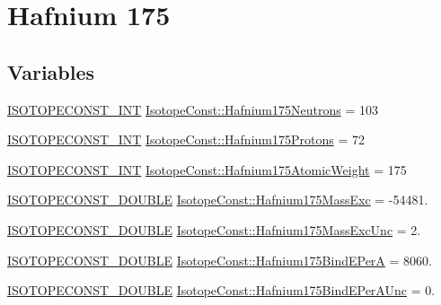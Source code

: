 \hypertarget{group___isotope_const-_hafnium-_hf175}{}\section{Hafnium 175}
\label{group___isotope_const-_hafnium-_hf175}
\subsection*{Variables}
\begin{DoxyCompactItemize}
\item 
\mbox{\hyperlink{group___isotope_const-_macros_ga5f18360b3e99483a35c32d789e62621c}{I\+S\+O\+T\+O\+P\+E\+C\+O\+N\+S\+T\+\_\+\+I\+NT}} \mbox{\hyperlink{group___isotope_const-_hafnium-_hf175_ga3a0d27dcbef40b07f9a3865d6d050e48}{Isotope\+Const\+::\+Hafnium175\+Neutrons}} = 103
\item 
\mbox{\hyperlink{group___isotope_const-_macros_ga5f18360b3e99483a35c32d789e62621c}{I\+S\+O\+T\+O\+P\+E\+C\+O\+N\+S\+T\+\_\+\+I\+NT}} \mbox{\hyperlink{group___isotope_const-_hafnium-_hf175_gae7463374718cfce819bdbf30c5553ccc}{Isotope\+Const\+::\+Hafnium175\+Protons}} = 72
\item 
\mbox{\hyperlink{group___isotope_const-_macros_ga5f18360b3e99483a35c32d789e62621c}{I\+S\+O\+T\+O\+P\+E\+C\+O\+N\+S\+T\+\_\+\+I\+NT}} \mbox{\hyperlink{group___isotope_const-_hafnium-_hf175_gaa6ff95553199011800c301b69f704ac4}{Isotope\+Const\+::\+Hafnium175\+Atomic\+Weight}} = 175
\item 
\mbox{\hyperlink{group___isotope_const-_macros_ga8f45a7272ce02c0b4c65c44636ed719a}{I\+S\+O\+T\+O\+P\+E\+C\+O\+N\+S\+T\+\_\+\+D\+O\+U\+B\+LE}} \mbox{\hyperlink{group___isotope_const-_hafnium-_hf175_ga2566d545228b95e26ab69b3d80675e21}{Isotope\+Const\+::\+Hafnium175\+Mass\+Exc}} = -\/54481.
\item 
\mbox{\hyperlink{group___isotope_const-_macros_ga8f45a7272ce02c0b4c65c44636ed719a}{I\+S\+O\+T\+O\+P\+E\+C\+O\+N\+S\+T\+\_\+\+D\+O\+U\+B\+LE}} \mbox{\hyperlink{group___isotope_const-_hafnium-_hf175_ga7fca27c342b440f1838744d4b1dab2f0}{Isotope\+Const\+::\+Hafnium175\+Mass\+Exc\+Unc}} = 2.
\item 
\mbox{\hyperlink{group___isotope_const-_macros_ga8f45a7272ce02c0b4c65c44636ed719a}{I\+S\+O\+T\+O\+P\+E\+C\+O\+N\+S\+T\+\_\+\+D\+O\+U\+B\+LE}} \mbox{\hyperlink{group___isotope_const-_hafnium-_hf175_ga51483f9cade15e172a97b839c3d25cb7}{Isotope\+Const\+::\+Hafnium175\+Bind\+E\+PerA}} = 8060.
\item 
\mbox{\hyperlink{group___isotope_const-_macros_ga8f45a7272ce02c0b4c65c44636ed719a}{I\+S\+O\+T\+O\+P\+E\+C\+O\+N\+S\+T\+\_\+\+D\+O\+U\+B\+LE}} \mbox{\hyperlink{group___isotope_const-_hafnium-_hf175_gab0144dd5a474c86a7504efe9d6251f77}{Isotope\+Const\+::\+Hafnium175\+Bind\+E\+Per\+A\+Unc}} = 0.

\end{DoxyCompactItemize}
